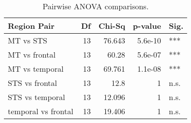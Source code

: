 \begin{table}[h]
\centering
\begin{tabular}{lrrrl}
\toprule
 Region Pair          &   Df &   Chi-Sq &   p-value & Sig.   \\
\midrule
 MT vs  STS           &   13 &   76.643 &   5.6e-10 & ***    \\
 MT vs  frontal       &   13 &   60.28  &   5.6e-07 & ***    \\
 MT vs  temporal      &   13 &   69.761 &   1.1e-08 & ***    \\
 STS vs  frontal      &   13 &   12.8   &   1       & n.s.   \\
 STS vs  temporal     &   13 &   12.096 &   1       & n.s.   \\
 temporal vs  frontal &   13 &   19.406 &   1       & n.s.   \\
\bottomrule
\end{tabular}
\caption{Pairwise ANOVA comparisons.}
\end{table}